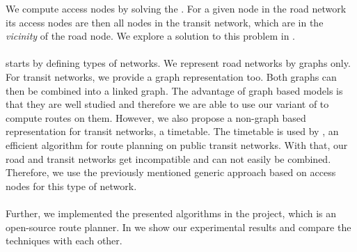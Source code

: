 	We compute access nodes by solving the \nearestNeighborProblem. For a given node in the road network its access
	nodes are then all nodes in the transit network, which are in the \textit{vicinity} of the road node. We explore a solution
	to this problem in .\\\\
	 starts by defining types of networks. We represent road networks by graphs only.
	For transit networks, we provide a graph representation too. Both graphs can then be combined into a linked graph.
	The advantage of graph based models is that they are well studied and therefore we are able to use our
	\multiModal variant of \dijkstra to compute routes on them.
	However, we also propose a non-graph based representation for transit networks, a timetable. The timetable is used by \csa,
	an efficient algorithm for route planning on public transit networks. With that, our road and transit networks get incompatible
	and can not easily be combined. Therefore, we use the previously mentioned generic approach based on access nodes
	for this type of network.\\\\
	Further, we implemented the presented algorithms in the \cobweb {} project, which is an open-source \multiModal
	route planner. In  we show our experimental results and compare the techniques with each other.